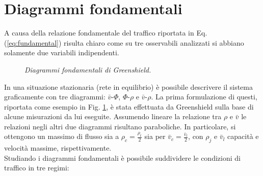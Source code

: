 \documentclass[../main.tex]{subfiles}
\begin{document}
\section{Diagrammi fondamentali}
A causa della relazione fondamentale del traffico riportata in Eq. (\ref{eq:fundamental}) risulta chiaro come su tre osservabili analizzati si abbiano solamente due variabili indipendenti.
\begin{figure}[H]
\centering
{}
\caption[Diagrammi fondamentali di Greenshield]{\emph{Diagrammi fondamentali di Greenshield.}}
\label{fig:greenshield}
\end{figure}
In una situazione stazionaria (rete in equilibrio) \`e possibile descrivere il sistema graficamente con tre diagrammi: $\bar{v}$-$\Phi$, $\Phi$-$\rho$ e $\bar{v}$-$\rho$.
La prima formulazione di questi, riportata come esempio in Fig. \ref{fig:greenshield}, \`e stata effettuata da Greenshield sulla base di alcune misurazioni da lui eseguite.
Assumendo lineare la relazione tra $\rho$ e $\bar{v}$ le relazioni negli altri due diagrammi risultano paraboliche.
In particolare, si ottengono un massimo di flusso sia a $\rho_c=\frac{\rho_t}{2}$ sia per $\bar{v}_c=\frac{\bar{v}_l}{2}$, con $\rho_j$ e $\bar{v}_l$ capacit\`a e velocit\`a massime, rispettivamente.
\\Studiando i diagrammi fondamentali \`e possibile suddividere le condizioni di traffico in tre regimi:
\end{document}
